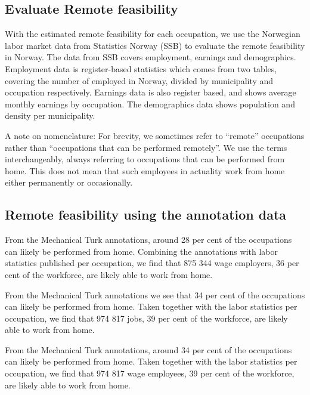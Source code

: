 \documentclass[11pt,]{article}
\begin{document}
\hypertarget{evaluate-remote-feasibility}{%
\subsection{Evaluate Remote
feasibility}\label{evaluate-remote-feasibility}}

With the estimated remote feasibility for each occupation, we use the
Norwegian labor market data from Statistics Norway (SSB) to evaluate the
remote feasibility in Norway. The data from SSB covers employment,
earnings and demographics. Employment data is register-based statistics
which comes from two tables, covering the number of employed in Norway,
divided by municipality and occupation respectively. Earnings data is
also register based, and shows average monthly earnings by occupation.
The demographics data shows population and density per municipality.

A note on nomenclature: For brevity, we sometimes refer to ``remote''
occupations rather than ``occupations that can be performed remotely''.
We use the terms interchangeably, always referring to occupations that
can be performed from home. This does not mean that such employees in
actuality work from home either permanently or occasionally.

\hypertarget{remote-feasibility-using-the-annotation-data}{%
\subsection{Remote feasibility using the annotation
data}\label{remote-feasibility-using-the-annotation-data}}

From the Mechanical Turk annotations, around 28 per cent of the
occupations can likely be performed from home. Combining the annotations
with labor statistics published per occupation, we find that 875 344
wage employers, 36 per cent of the workforce, are likely able to work
from home.

From the Mechanical Turk annotations we see that 34 per cent of the
occupations can likely be performed from home. Taken together with the
labor statistics per occupation, we find that 974 817 jobs, 39 per cent
of the workforce, are likely able to work from home.

From the Mechanical Turk annotations, around 34 per cent of the
occupations can likely be performed from home. Taken together with the
labor statistics per occupation, we find that 974 817 wage employees, 39
per cent of the workforce, are likely able to work from home.
\end{document}
